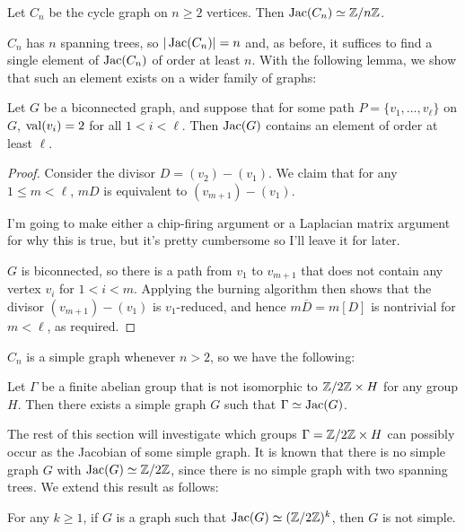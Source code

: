 \documentclass{amsart}
\begin{document}
\begin{prop}
  \label{prop:cycle_cyclic}
  Let $C_n$ be the cycle graph on $n \ge 2$ vertices. Then $\operatorname{Jac}(C_n) \simeq
  \mathbb{Z}/n\mathbb{Z}$.
\end{prop}

$C_n$ has $n$ spanning trees, so $|\operatorname{Jac}(C_n)|=n$ and, as before, it
suffices to find a single element of $\operatorname{Jac}(C_n)$ of order at least
$n$. With the following lemma, we show that such an element exists on a wider family of graphs:

\begin{lem}
  \label{lem:2valent_path}
  Let $G$ be a biconnected graph, and suppose that for some path $P =
  \{v_1, \ldots, v_\ell\}$ on $G$, $\operatorname{val}(v_i) = 2$ for all $1 < i <
  \ell$. Then $\operatorname{Jac}(G)$ contains an element of order at least $\ell$.
\end{lem}
\begin{proof}
  Consider the divisor $D = (v_2) - (v_1)$. We claim that for any $1
  \le m < \ell$, $mD$ is equivalent to $(v_{m+1}) - (v_1)$.

  I'm going to make either a chip-firing argument or a Laplacian
  matrix argument for why this is true, but it's pretty cumbersome so
  I'll leave it for later.

  $G$ is biconnected, so there is a path from $v_1$ to $v_{m+1}$ that
  does not contain any vertex $v_i$ for $1 < i < m$. Applying the
  burning algorithm then shows that the divisor $(v_{m+1}) - (v_1)$ is
  $v_1$-reduced, and hence $m\overline{D} = m[D]$ is nontrivial for $m
  < \ell$, as required.
\end{proof}

$C_n$ is a simple graph whenever $n > 2$, so we have the following:

\begin{cor}
  Let $\Gamma$ be a finite abelian group that is not isomorphic to
  $\mathbb{Z}/2\mathbb{Z} \times H$ for any group $H$. Then there exists a simple
  graph $G$ such that $\Gamma \simeq \operatorname{Jac}(G)$.
\end{cor}

The rest of this section will investigate which groups $\Gamma =
\mathbb{Z}/2\mathbb{Z} \times H$ can possibly occur as the Jacobian of some simple
graph. It is known that there is no simple graph $G$ with $\operatorname{Jac}(G)
\simeq \mathbb{Z}/2\mathbb{Z}$, since there is no simple graph with two spanning trees. We extend this result as
follows:

\begin{thm}
  \label{thm:2group}
  For any $k \ge 1$, if $G$ is a graph such that $\operatorname{Jac}(G) \simeq
  (\mathbb{Z}/2\mathbb{Z})^k$, then $G$ is not simple.
\end{thm}
\end{document}
